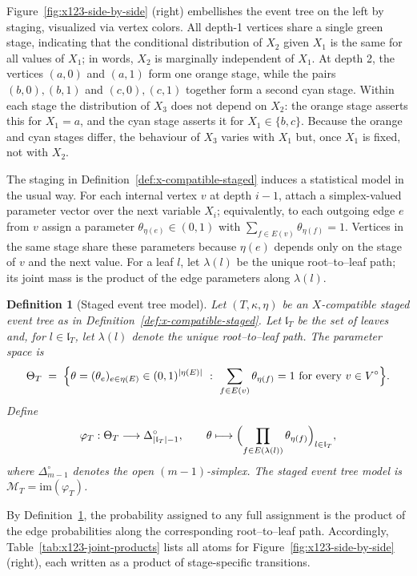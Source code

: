\documentclass[preprint,12pt]{elsarticle}
\newtheorem{mydef}{Definition}
\begin{document}
Figure~\ref{fig:x123-side-by-side} (right) embellishes the event tree on the left by staging, visualized via vertex colors. All depth-1 vertices share a single green stage, indicating that the conditional distribution of $X_2$ given $X_1$ is the same for all values of $X_1$; in words, $X_2$ is marginally independent of $X_1$. At depth 2, the vertices $(a,0)$ and $(a,1)$ form one orange stage, while the pairs $(b,0),(b,1)$ and $(c,0),(c,1)$ together form a second cyan stage. Within each stage the distribution of $X_3$ does not depend on $X_2$: the orange stage asserts this for $X_1=a$, and the cyan stage asserts it for $X_1\in\{b,c\}$. Because the orange and cyan stages differ, the behaviour of $X_3$ varies with $X_1$ but, once $X_1$ is fixed, not with $X_2$.

The staging in Definition~\ref{def:x-compatible-staged} induces a statistical model in the usual way. 
For each internal vertex \(v\) at depth \(i-1\), attach a simplex-valued parameter vector over the next variable \(X_i\); equivalently, to each outgoing edge \(e\) from \(v\) assign a parameter \(\theta_{\eta(e)}\in(0,1)\) with \(\sum_{f\in E(v)} \theta_{\eta(f)}=1\). 
Vertices in the same stage share these parameters because \(\eta(e)\) depends only on the stage of \(v\) and the next value. 
For a leaf \(l\), let \(\lambda(l)\) be the unique root--to--leaf path; its joint mass is the product of the edge parameters along \(\lambda(l)\). 



\begin{mydef}[Staged event tree model]\label{def:set-model}
Let $(T,\kappa,\eta)$ be an $X$-compatible staged event tree as in Definition~\ref{def:x-compatible-staged}. 
Let $\mathfrak l_T$ be the set of leaves and, for $l\in\mathfrak l_T$, let $\lambda(l)$ denote the unique root--to--leaf path.
The parameter space is
\[
\Theta_T \;=\; \Bigl\{ \theta=(\theta_e)_{e\in\eta(E)} \in (0,1)^{|\eta(E)|} \ :\ 
\sum_{f\in E(v)} \theta_{\eta(f)} = 1 \ \text{for every } v\in V^{\circ} \Bigr\}.
\]
Define
\[
\varphi_T:\Theta_T\longrightarrow \Delta^{\circ}_{|\mathfrak l_T|-1}, 
\qquad 
\theta \longmapsto \Bigl( \prod_{f\in E(\lambda(l))} \theta_{\eta(f)} \Bigr)_{l\in\mathfrak l_T},
\]
where $\Delta^{\circ}_{m-1}$ denotes the open $(m\!-\!1)$-simplex.
The \textnormal{staged event tree model} is $\mathcal M_T=\mathrm{im}(\varphi_T)$.
\end{mydef}


By Definition~\ref{def:set-model}, the probability assigned to any full assignment is the product of the edge probabilities along the corresponding root--to--leaf path. Accordingly, Table~\ref{tab:x123-joint-products} lists all atoms for Figure~\ref{fig:x123-side-by-side} (right), each written as a product of stage-specific transitions.
\end{document}
